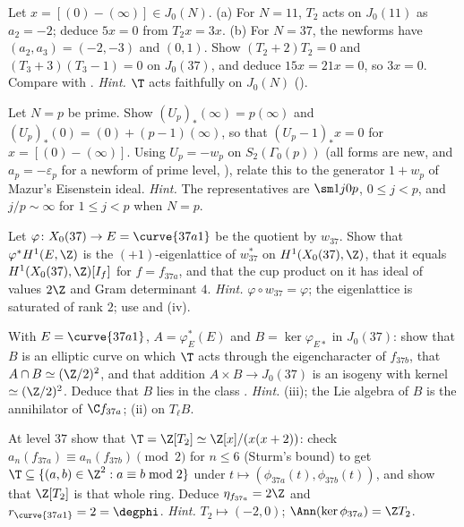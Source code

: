 \begin{exercise}\label{ex:moddeg:ex-md}
Let $x=[(0)-(\infty)]\in J_0(N)$. (a) For $N=11$, $T_2$ acts on $J_0(11)$ as $a_2=-2$; deduce $5x=0$ from $T_2x=3x$. (b) For $N=37$, the newforms have $(a_2,a_3)=(-2,-3)$ and $(0,1)$. Show $(T_2+2)T_2=0$ and
$(T_3+3)(T_3-1)=0$ on $J_0(37)$, and deduce $15x=21x=0$, so $3x=0$. Compare with . \emph{Hint.} $\T$ acts faithfully on $J_0(N)$ ().
\end{exercise}

\begin{exercise}\label{ex:moddeg:ex-up-cusp}
Let $N=p$ be prime. Show $(U_p)_*(\infty)=p(\infty)$ and $(U_p)_*(0)=(0)+(p-1)(\infty)$, so that $(U_p-1)_*x=0$ for $x=[(0)-(\infty)]$. Using $U_p=-w_p$ on $S_2(\Gamma_0(p))$ (all forms are new, and $a_p=-\varepsilon_p$ for a
newform of prime level, ), relate this to the generator $1+w_p$ of Mazur's Eisenstein ideal. \emph{Hint.} The representatives are $\sm1j0p$, $0\le j<p$, and $j/p\sim\infty$ for $1\le j<p$ when $N=p$.
\end{exercise}

\begin{exercise}\label{ex:moddeg:ex-37-lattice}
Let $\varphi\colon X_0(37)\to E=\curve{37a1}$ be the quotient by $w_{37}$. Show that $\varphi^*H^1(E,\Z)$ is the $(+1)$-eigenlattice of $w_{37}^*$ on $H^1(X_0(37),\Z)$, that it equals $H^1(X_0(37),\Z)[I_f]$ for $f=f_{37a}$,
and that the cup product on it has ideal of values $2\Z$ and Gram determinant $4$. \emph{Hint.} $\varphi\circ w_{37}=\varphi$; the eigenlattice is saturated of rank $2$; use  and
(iv).
\end{exercise}

\begin{exercise}\label{ex:moddeg:ex-j037}
With $E=\curve{37a1}$, $A=\varphi_E^*(E)$ and $B=\ker\varphi_{E*}$ in $J_0(37)$: show that $B$ is an elliptic curve on which $\T$ acts through the eigencharacter of $f_{37b}$, that $A\cap B\simeq(\Z/2)^2$, and that
addition $A\times B\to J_0(37)$ is an isogeny with kernel $\simeq(\Z/2)^2$. Deduce that $B$ lies in the class . \emph{Hint.} (iii); the Lie algebra of $B$ is the
annihilator of $\C f_{37a}$; (ii) on $T_\ell B$.
\end{exercise}

\begin{exercise}\label{ex:moddeg:ex-level37-hecke}
At level $37$ show that $\T=\Z[T_2]\simeq\Z[x]/(x(x+2))$: check $a_n(f_{37a})\equiv a_n(f_{37b})\pmod2$ for $n\le6$ (Sturm's bound) to get $\T\subseteq\{(a,b)\in\Z^2:a\equiv b\bmod2\}$ under
$t\mapsto(\phi_{37a}(t),\phi_{37b}(t))$, and show that $\Z[T_2]$ is that whole ring. Deduce $\eta_{f_{37a}}=2\Z$ and $r_{\curve{37a1}}=2=\degphi$. \emph{Hint.} $T_2\mapsto(-2,0)$; $\Ann(\ker\phi_{37a})=\Z T_2$.
\end{exercise}

